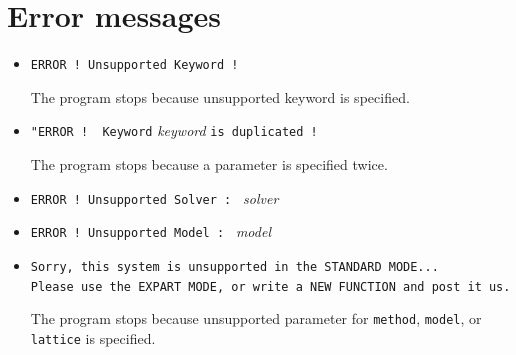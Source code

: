 \newpage
\section{Error messages}

\begin{itemize}
\item \verb|ERROR ! Unsupported Keyword !|

The program stops because unsupported keyword is specified.

\item \verb|"ERROR !  Keyword| \textit{keyword} \verb|is duplicated !|

The program stops because a parameter is specified twice.

\item \verb|ERROR ! Unsupported Solver : | \textit{solver} \vspace{-0.3cm}
\item \verb|ERROR ! Unsupported Model : | \textit{model} \vspace{-0.3cm}
\item \verb|Sorry, this system is unsupported in the STANDARD MODE...| \\
  \verb|Please use the EXPART MODE, or write a NEW FUNCTION and post it us.|

The program stops because unsupported parameter for 
\verb|method|, \verb|model|, or \verb|lattice|
is specified.


\end{itemize}
